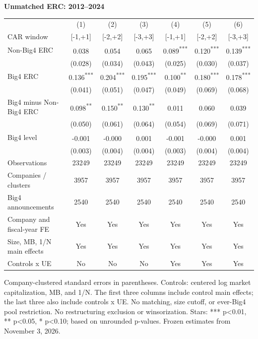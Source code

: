 \documentclass[10pt]{article}
\newcommand{\sym}[1]{\textsuperscript{#1}}\pagestyle{empty}
\begin{document}
\noindent\textbf{Unmatched ERC: 2012--2024}\par\medskip
\setlength{\tabcolsep}{3pt}\renewcommand{\arraystretch}{1.1}
\noindent\begin{tabular*}{\textwidth}{@{\extracolsep{\fill}}lcccccc@{}}\toprule
 & (1) & (2) & (3) & (4) & (5) & (6) \\
CAR window & [-1,+1] & [-2,+2] & [-3,+3] & [-1,+1] & [-2,+2] & [-3,+3] \\\midrule
Non-Big4 ERC & 0.038\sym{} & 0.054\sym{} & 0.065\sym{} & 0.089\sym{***} & 0.120\sym{***} & 0.139\sym{***} \\
 & (0.028) & (0.034) & (0.043) & (0.025) & (0.030) & (0.037) \\
Big4 ERC & 0.136\sym{***} & 0.204\sym{***} & 0.195\sym{***} & 0.100\sym{**} & 0.180\sym{***} & 0.178\sym{***} \\
 & (0.041) & (0.051) & (0.047) & (0.049) & (0.069) & (0.068) \\
Big4 minus Non-Big4 ERC & 0.098\sym{**} & 0.150\sym{**} & 0.130\sym{**} & 0.011\sym{} & 0.060\sym{} & 0.039\sym{} \\
 & (0.050) & (0.061) & (0.064) & (0.054) & (0.069) & (0.071) \\
Big4 level & -0.001\sym{} & -0.000\sym{} & 0.001\sym{} & -0.001\sym{} & -0.000\sym{} & 0.001\sym{} \\
 & (0.003) & (0.004) & (0.004) & (0.003) & (0.004) & (0.004) \\
Observations & 23249 & 23249 & 23249 & 23249 & 23249 & 23249 \\
Companies / clusters & 3957 & 3957 & 3957 & 3957 & 3957 & 3957 \\
Big4 announcements & 2540 & 2540 & 2540 & 2540 & 2540 & 2540 \\
Company and fiscal-year FE & Yes & Yes & Yes & Yes & Yes & Yes \\
Size, MB, 1/N main effects & Yes & Yes & Yes & Yes & Yes & Yes \\
Controls x UE & No & No & No & Yes & Yes & Yes \\
\bottomrule\end{tabular*}\par\medskip
\noindent\footnotesize Company-clustered standard errors in parentheses. Controls: centered log market capitalization, MB, and 1/N. The first three columns include control main effects; the last three also include controls x UE. No matching, size cutoff, or ever-Big4 pool restriction. No restructuring exclusion or winsorization. Stars: *** p<0.01, ** p<0.05, * p<0.10; based on unrounded p-values. Frozen estimates from November 3, 2026.
\end{document}
